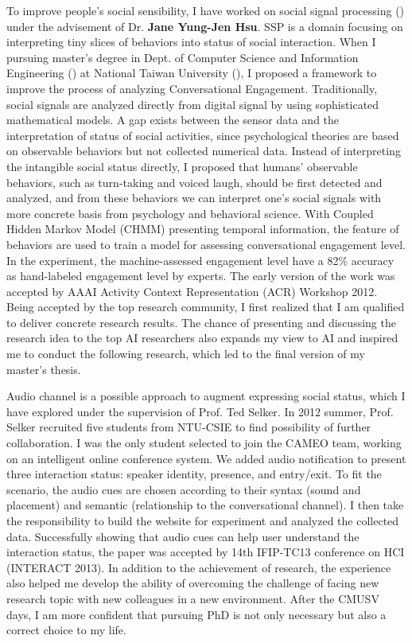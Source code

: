 To improve people’s social sensibility, 
I have worked on social signal processing () under the advisement of Dr. \textbf{Jane Yung-Jen Hsu}. 
SSP is a domain focusing on interpreting tiny slices of behaviors into status of social interaction. 
When I pursuing master’s degree in Dept. of Computer Science and Information Engineering () at National Taiwan University (), 
I proposed a framework to improve the process of analyzing Conversational Engagement. 
Traditionally, social signals are analyzed directly from digital signal by using sophisticated mathematical models. 
A gap exists between the sensor data and the interpretation of status of social activities, 
since psychological theories are based on observable behaviors but not collected numerical data. 
Instead of interpreting the intangible social status directly, I proposed that humans’ observable behaviors, 
such as turn-taking and voiced laugh, should be first detected and analyzed, 
and from these behaviors we can interpret one’s social signals with more concrete basis from psychology and behavioral science. 
With Coupled Hidden Markov Model (CHMM) presenting temporal information, 
the feature of behaviors are used to train a model for assessing conversational engagement level. 
In the experiment, the machine-assessed engagement level have a 82\% accuracy as hand-labeled engagement level by experts. 
The early version of the work was accepted by AAAI Activity Context Representation (ACR) Workshop 2012. 
Being accepted by the top research community, I first realized that I am qualified to deliver concrete research results. 
The chance of presenting and discussing the research idea to the top AI researchers also expands my view to AI and inspired me to conduct the following research, which led to the final version of my master’s thesis.

Audio channel is a possible approach to augment expressing social status, which I have explored under the supervision of Prof. Ted Selker. In 2012 summer, Prof. Selker recruited five students from NTU-CSIE to find possibility of further collaboration. I was the only student selected to join the CAMEO team, working on an intelligent online conference system. We added audio notification to present three interaction status: speaker identity, presence, and entry/exit. To fit the scenario, the audio cues are chosen according to their syntax (sound and placement) and semantic (relationship to the conversational channel). I then take the responsibility to build the website for experiment and analyzed the collected data. Successfully showing that audio cues can help user understand the interaction status, the paper was accepted by 14th IFIP-TC13 conference on HCI (INTERACT 2013). In addition to the achievement of research, the experience also helped me develop the ability of overcoming the challenge of facing new research topic with new colleagues in a new environment. After the CMUSV days, I am more confident that pursuing PhD is not only necessary but also a correct choice to my life.





